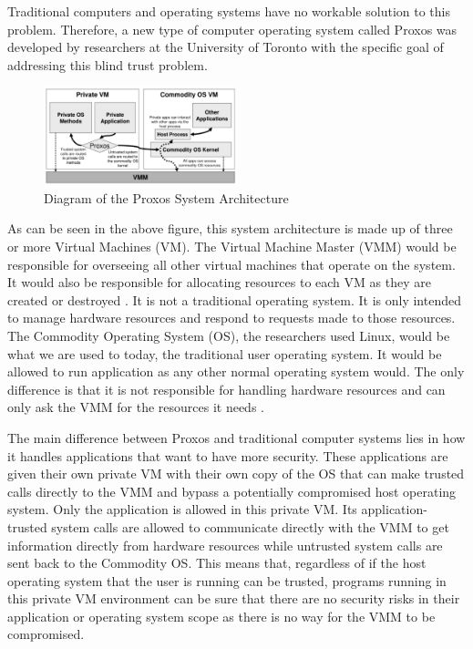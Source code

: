 \documentclass[conference, 12pt]{IEEEtran}
\begin{document}
Traditional computers and operating systems have no workable solution to this problem. Therefore, a new type of computer operating system called Proxos was developed by researchers at the University of Toronto with the specific goal of addressing this blind trust problem.

\begin{figure}[htbp]
    \centering
    \centerline{\includegraphics[width=0.5\textwidth]{Figure3.png}}
    \caption{Diagram of the Proxos System Architecture \cite{ta2006splitting}}
    \label{Figure3}
\end{figure}

As can be seen in the above figure, this system architecture is made up of three or more Virtual Machines (VM). The Virtual Machine Master (VMM) would be responsible for overseeing all other virtual machines that operate on the system. It would also be responsible for allocating resources to each VM as they are created or destroyed \cite{ta2006splitting}. It is not a traditional operating system. It is only intended to manage hardware resources and respond to requests made to those resources. The Commodity Operating System (OS), the researchers used Linux, would be what we are used to today, the traditional user operating system. It would be allowed to run application as any other normal operating system would. The only difference is that it is not responsible for handling hardware resources and can only ask the VMM for the resources it needs \cite{ta2006splitting}.

The main difference between Proxos and traditional computer systems lies in how it handles applications that want to have more security. These applications are given their own private VM with their own copy of the OS that can make trusted calls directly to the VMM and bypass a potentially compromised host operating system. Only the application is allowed in this private VM. Its application-trusted system calls are allowed to communicate directly with the VMM to get information directly from hardware resources while untrusted system calls are sent back to the Commodity OS\cite{ta2006splitting}. This means that, regardless of if the host operating system that the user is running can be trusted, programs running in this private VM environment can be sure that there are no security risks in their application or operating system scope as there is no way for the VMM to be compromised.
\end{document}
